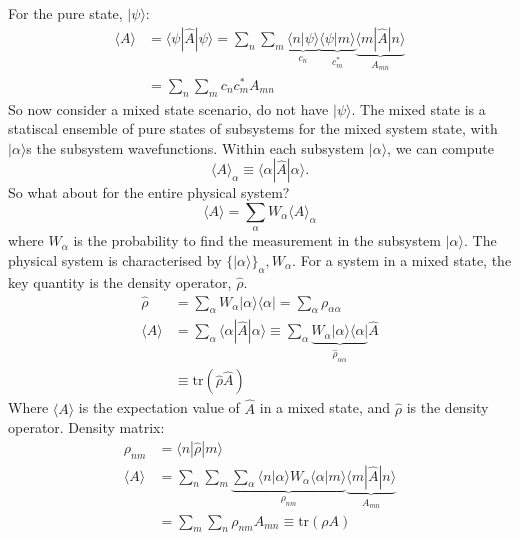 \documentclass[a4paper, 11pt, normalem]{report}
\begin{document}
\chapter{}
For the pure state, $|\psi\rangle$:
\begin{align}
    \langle A\rangle &= \langle\psi|\hat{A}|\psi\rangle = \sum_n\sum_m \underbrace{\langle n|\psi\rangle}_{c_n} \underbrace{\langle\psi|m\rangle}_{c_m^*} \underbrace{\langle m|\hat{A}|n\rangle}_{A_{mn}} \\
                     &= \sum_n\sum_m c_nc_m^* A_{mn}
\end{align}
So now consider a mixed state scenario, do not have $|\psi\rangle$.
The mixed state is a statiscal ensemble of pure states of subsystems for the mixed system state, with $|\alpha\rangle$s the subsystem wavefunctions. 
Within each subsystem $|\alpha\rangle$, we can compute 
\begin{equation}
    \langle A\rangle_\alpha \equiv \langle\alpha|\hat{A}|\alpha\rangle.
\end{equation}
So what about for the entire physical system?
\begin{equation}
    \langle A\rangle = \sum_\alpha W_\alpha \langle A\rangle_\alpha
\end{equation}
where $W_\alpha$ is the probability to find the measurement in the subsystem $|\alpha\rangle$.
The physical system is characterised by $\{|\alpha\rangle\}_\alpha,W_\alpha$.
For a system in a mixed state, the key quantity is the density operator, $\hat{\rho}$.
\begin{align}
    \hat{\rho} &= \sum_\alpha W_\alpha |\alpha\rangle \langle\alpha| = \sum_\alpha \rho_{\alpha\alpha} \\
    \langle A\rangle &= \sum_\alpha \langle\alpha|\hat{A}|\alpha\rangle \equiv \sum_\alpha \underbrace{W_\alpha |\alpha\rangle\langle\alpha|}_{\hat{\rho}_{\alpha\alpha}}\hat{A} \\
                     &\equiv \text{tr}(\hat{\rho}\hat{A})
\end{align}
Where $\langle A\rangle$ is the expectation value of $\hat{A}$ in a mixed state, and $\hat{\rho}$ is the density operator.
Density matrix:
\begin{align}
    \rho_{nm} &= \langle n|\hat{\rho}|m\rangle \\
    \langle A\rangle &= \sum_n \sum_m \underbrace{\sum_\alpha \langle n|\alpha\rangle W_\alpha \langle\alpha|m\rangle}_{\rho_{nm}} \underbrace{\langle m|\hat{A}|n\rangle}_{A_{mn}} \\
                     &= \sum_m \sum_n \rho_{nm}A_{mn} \equiv \text{tr}(\rho A)
\end{align}
\end{document}
